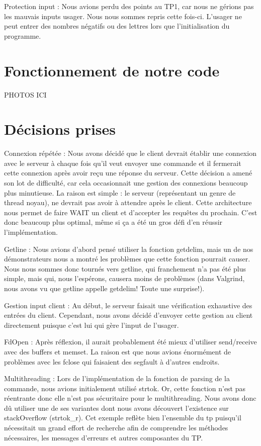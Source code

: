 \documentclass[11pt]{article}
\begin{document}
Protection input : Nous avions perdu des points au TP1, car nous ne gérions pas les mauvais inputs usager. Nous nous sommes repris cette fois-ci. L’usager ne peut entrer des nombres négatifs ou des lettres lors que l’initialisation du programme. 

\section{Fonctionnement de notre code}

PHOTOS ICI

\section{Décisions prises}
Connexion répétée : Nous avons décidé que le client devrait établir une connexion avec le serveur à chaque fois qu'il veut envoyer une commande et il fermerait cette connexion après avoir reçu une réponse du serveur. Cette décision a amené son lot de difficulté, car cela occasionnait une gestion des connexions beaucoup plus minutieuse. La raison est simple : le serveur (représentant un genre de thread noyau), ne devrait pas avoir à attendre après le client. Cette architecture nous permet de faire WAIT un client et d’accepter les requêtes du prochain. C’est donc beaucoup plus optimal, même si ça a été un gros défi d’en réussir l’implémentation. 

Getline : Nous avions d’abord pensé utiliser la fonction getdelim, mais un de nos démonstrateurs nous a  montré les problèmes que cette fonction pourrait causer. Nous nous sommes donc tournés vers getline, qui franchement n’a pas été plus simple, mais qui, nous l’espérons, causera moins de problèmes (dans Valgrind, nous avons vu que getline appelle getdelim! Toute une surprise!).

Gestion input client : Au début, le serveur faisait une vérification exhaustive des entrées du client. Cependant, nous avons décidé d’envoyer cette gestion au client directement puisque c’est lui qui gère l’input de l’usager.

FdOpen : Après réflexion, il aurait probablement été mieux d’utiliser send/receive avec des buffers et memset. La raison est que nous avions énormément de problèmes avec les fclose qui faisaient des segfault à d’autres endroits.

Multithreading : Lors de l’implémentation de la fonction de parsing de la commande, nous avions initialement utilisé strtok. Or, cette fonction n'est pas réentrante donc elle n'est pas sécuritaire pour le multithreading. Nous avons donc dû utiliser une de ses variantes dont nous avons découvert l'existence sur stackOverflow (strtok_r). Cet exemple reflète bien l'ensemble du tp puisqu'il nécessitait un grand effort de recherche afin de comprendre les méthodes nécessaires, les messages d'erreurs et autres composantes du TP.
\end{document}
